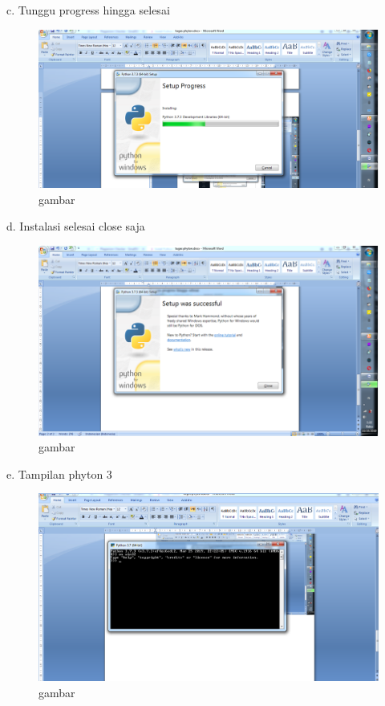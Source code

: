 \begin{enumerate}
c.	Tunggu progress hingga selesai

\begin{figure}
\begin{center} 
\includegraphics[scale=0.4]{src/soal1phyton3.PNG} 
\caption{gambar} 
\label{unhas} 
\end{center} 
\end{figure}

d.	Instalasi selesai close saja

\begin{figure}
\begin{center} 
\includegraphics[scale=0.4]{src/soal1phyton4.PNG} 
\caption{gambar} 
\label{unhas} 
\end{center} 
\end{figure}

e.	Tampilan phyton 3

\begin{figure}
\begin{center} 
\includegraphics[scale=0.4]{src/soal1phyton5.PNG} 
\caption{gambar} 
\label{unhas} 
\end{center} 
\end{figure}


\end{enumerate}
